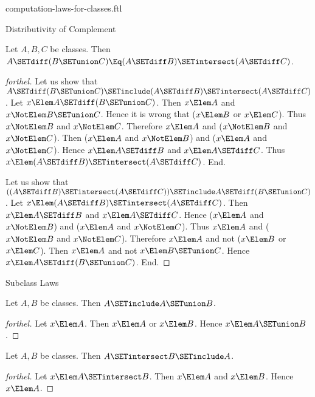 \documentclass{stex}
\begin{document}
\begin{smodule}{computation-laws-for-classes.ftl}
\begin{sfragment}{Distributivity of Complement}
  \begin{proposition}[forthel,id=FOUNDATIONS_02_2909554153095168]
    Let $A, B, C$ be classes.
    Then $A \SETdiff (B \SETunion C) \Eq (A \SETdiff B) \SETintersect (A \SETdiff C)$.
  \end{proposition}
  \begin{proof}[forthel]
    Let us show that $A \SETdiff (B \SETunion C) \SETinclude (A \SETdiff B) \SETintersect (A \SETdiff C)$.
      Let $x \Elem A \SETdiff (B \SETunion C)$.
      Then $x \Elem A$ and $x \NotElem B \SETunion C$.
      Hence it is wrong that ($x \Elem B$ or $x \Elem C$).
      Thus $x \NotElem B$ and $x \NotElem C$.
      Therefore $x \Elem A$ and ($x \NotElem B$ and $x \NotElem C$).
      Then ($x \Elem A$ and $x \NotElem B$) and ($x \Elem A$ and $x \NotElem C$).
      Hence $x \Elem A \SETdiff B$ and $x \Elem A \SETdiff C$.
      Thus $x \Elem (A \SETdiff B) \SETintersect (A \SETdiff C)$.
    End.

    Let us show that $((A \SETdiff B) \SETintersect (A \SETdiff C)) \SETinclude A \SETdiff (B \SETunion C)$. %
      Let $x \Elem (A \SETdiff B) \SETintersect (A \SETdiff C)$.
      Then $x \Elem A \SETdiff B$ and $x \Elem A \SETdiff C$.
      Hence ($x \Elem A$ and $x \NotElem B$) and ($x \Elem A$ and $x \NotElem C$).
      Thus $x \Elem A$ and ($x \NotElem B$ and $x \NotElem C$).
      Therefore $x \Elem A$ and not ($x \Elem B$ or $x \Elem C$).
      Then $x \Elem A$ and not $x \Elem B \SETunion C$.
      Hence $x \Elem A \SETdiff (B \SETunion C)$.
    End.
  \end{proof}
\end{sfragment}

\begin{sfragment}{Subclass Laws}
  \begin{proposition}[forthel,id=FOUNDATIONS_02_3793981508943872]
    Let $A, B$ be classes.
    Then $A \SETinclude A \SETunion B$.
  \end{proposition}
  \begin{proof}[forthel]
    Let $x \Elem A$.
    Then $x \Elem A$ or $x \Elem B$.
    Hence $x \Elem A \SETunion B$.
  \end{proof}

  \begin{proposition}[forthel,id=FOUNDATIONS_02_1591517646946304]
    Let $A, B$ be classes.
    Then $A \SETintersect B \SETinclude A$.
  \end{proposition}
  \begin{proof}[forthel]
    Let $x \Elem A \SETintersect B$.
    Then $x \Elem A$ and $x \Elem B$.
    Hence $x \Elem A$.
  \end{proof}


\end{sfragment}
\end{smodule}
\end{document}
